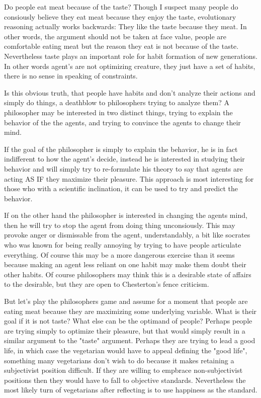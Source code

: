 \documentclass[12pt]{report}
\numberwithin{equation}{section}
\begin{document}
Do people eat meat because of the taste? Though I suspect many people do consiously believe they eat meat because they enjoy the taste, evolutionary reasoning actually works backwards: They like the taste because they meat. In other words, the argument should not be taken at face value, people are comfortable eating meat but the reason they eat is not because of the taste. Nevertheless taste plays an important role for habit formation of new generations. In other words agent's are not optimizing creature, they just have a set of habits, there is no sense in speaking of constraints. 

Is this obvious truth, that people have habits and don't analyze their actions and simply do things, a deathblow to philosophers trying to analyze them? A philosopher may be interested in two distinct things, trying to explain the behavior of the the agents, and trying to convince the agents to change their mind. 

If the goal of the philosopher is simply to explain the behavior, he is in fact indifferent to how the agent's decide, instead he is interested in studying their behavior and will simply try to re-formulate his theory to say that agents are acting AS IF they maximize their pleasure. This approach is most interesting for those who with a scientific inclination, it can be used to try and predict the behavior. 

If on the other hand the philosopher is interested in changing the agents mind, then he will try to stop the agent from doing thing unconsiously. This may provoke anger or dismissable from the agent, understandably, a bit like socrates who was known for being really annoying by trying to have people articulate everything. Of course this may be a more dangerous exercise than it seems because making an agent less reliant on one habit may make them doubt their other habits. Of course philosophers may think this is a desirable state of affairs to the desirable, but they are open to Chesterton's fence criticism. 

But let's play the philosophers game and assume for a moment that people are eating meat because they are maximizing some underlying variable. What is their goal if it is not taste? What else can be the optimand of people? Perhaps people are trying simply to optimize their pleasure, but that would simply result in a similar argument to the "taste" argument. Perhaps they are trying to lead a good life, in which case the vegetarian would have to appeal defining the "good life", something many vegetarians don't wish to do because it makes retaining a subjectivist position difficult. If they are willing to empbrace non-subjectivist positions then they would have to fall to objective standards. Nevertheless the most likely turn of vegetarians after reflecting is to use happiness as the standard. 
\end{document}
